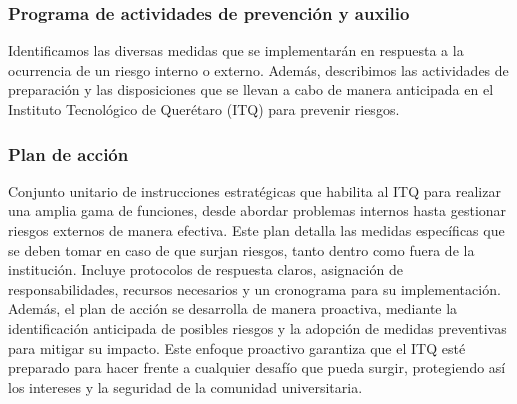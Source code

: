     \subsubsection{Programa de actividades de prevención y auxilio}
    Identificamos las diversas medidas que se implementarán en respuesta a la ocurrencia de un riesgo interno o externo. Además, describimos las actividades de preparación y las disposiciones que se llevan a cabo de manera anticipada en el Instituto Tecnológico de Querétaro (ITQ) para prevenir riesgos.
    \subsubsection{Plan de acción}
    Conjunto unitario de instrucciones estratégicas que habilita al ITQ para realizar una amplia gama de funciones, desde abordar problemas internos hasta gestionar riesgos externos de manera efectiva. Este plan detalla las medidas específicas que se deben tomar en caso de que surjan riesgos, tanto dentro como fuera de la institución. Incluye protocolos de respuesta claros, asignación de responsabilidades, recursos necesarios y un cronograma para su implementación. Además, el plan de acción se desarrolla de manera proactiva, mediante la identificación anticipada de posibles riesgos y la adopción de medidas preventivas para mitigar su impacto. Este enfoque proactivo garantiza que el ITQ esté preparado para hacer frente a cualquier desafío que pueda surgir, protegiendo así los intereses y la seguridad de la comunidad universitaria.
    
